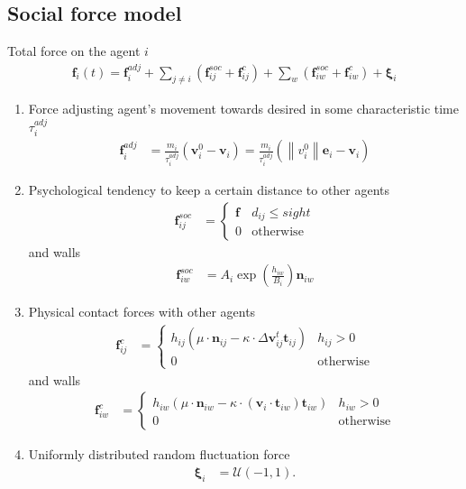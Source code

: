 \subsection{Social force model}
Total force on the agent $ i $
\begin{align}
\mathbf{f}_{i}(t) = \mathbf{f}_{i}^{adj} + \sum_{j\neq i}^{} \left(\mathbf{f}_{ij}^{soc} + \mathbf{f}_{ij}^{c}\right) + \sum_{w}^{} \left(\mathbf{f}_{iw}^{soc} + \mathbf{f}_{iw}^{c}\right) + \boldsymbol{\xi}_{i}
\end{align}

\begin{enumerate}[label=\roman{enumi})]
\item 
Force adjusting agent's movement towards desired in some characteristic time $ \tau_{i}^{adj} $
\begin{align}
\mathbf{f}_{i}^{adj} &= \frac{m_{i}}{\tau_{i}^{adj}} (\mathbf{v}_{i}^{0} - \mathbf{v}_{i}) = \frac{m_{i}}{\tau_{i}^{adj}} (\left\|v_{i}^{0}\right\| \mathbf{e}_{i} - \mathbf{v}_{i})
\end{align}


\item 
Psychological tendency to keep a certain distance to other agents
\begin{align}
\mathbf{f}_{ij}^{soc} &=
\begin{cases}
\mathbf{f}_{} &  d_{ij} \leq sight \\
0 & \text{otherwise}
\end{cases}
\end{align}
and walls
\begin{align}
\mathbf{f}_{iw}^{soc} &= A_{i} \exp\left(\frac{h_{iw}}{B_{i}}\right) \mathbf{n}_{iw}
\end{align} 


\item 
Physical contact forces with other agents 
\begin{align}
\mathbf{f}_{ij}^{c} &= 
\begin{cases}
h_{ij} \left(\mu \cdot \mathbf{n}_{ij} - \kappa \cdot \Delta \mathbf{v}_{ij}^{t} \mathbf{t}_{ij}\right) & h_{ij} > 0 \\
0 & \text{otherwise}
\end{cases}
\end{align}
and walls
\begin{align}
\mathbf{f}_{iw}^{c} &= 
\begin{cases}
h_{iw} \left(\mu \cdot \mathbf{n}_{iw} - \kappa \cdot (\mathbf{v}_{i} \cdot \mathbf{t}_{iw}) \mathbf{t}_{iw}\right) & h_{iw} > 0 \\
0 & \text{otherwise}
\end{cases}
\end{align}


\item 
Uniformly distributed random fluctuation force
\begin{align}
\boldsymbol{\xi}_{i} &= \boldsymbol{\mathcal{U}}(-1, 1).
\end{align}


\end{enumerate}


